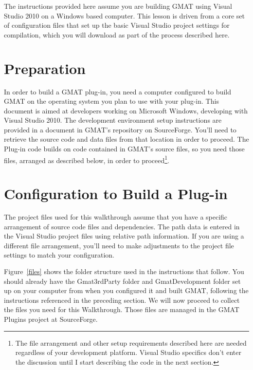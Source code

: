 \documentclass[10pt,letterpaper]{article}
\begin{document}
The instructions provided here assume you are building GMAT using Visual Studio 2010 on a Windows based computer.  This lesson is driven from a core set of configuration files that set up the basic Visual Studio project settings for compilation, which you will download as part of the process described here. 

\section{Preparation}

In order to build a GMAT plug-in, you need a computer configured to build GMAT on the operating system you plan to use with your plug-in.  This document is aimed at developers working on Microsoft Windows, developing with Visual Studio 2010.  The development environment setup instructions are provided in a document in GMAT's repository on SourceForge\cite{vsSetup}.  You'll need to retrieve the source code and data files from that location in order to proceed.  The Plug-in code builds on code contained in GMAT's source files, so you need those files, arranged as described below, in order to proceed\footnote{The file arrangement and other setup requirements described here are needed regardless of your development platform.  Visual Studio specifics don't enter the discussion until I start describing the code in the next section.}.

\section{Configuration to Build a Plug-in}

The project files used for this walkthrough assume that you have a specific arrangement of source code files and dependencies.  The path data is entered in the Visual Studio project files using relative path information.  If you are using a different file arrangement, you'll need to make adjustments to the project file settings to match your configuration.

Figure~\ref{files} shows the folder structure used in the instructions that follow.  You should already have the Gmat3rdParty folder and GmatDevelopment folder set up on your computer from when you configured it and built GMAT, following the instructions referenced in the preceding section.  We will now proceed to collect the files you need for this Walkthrough.  Those files are managed in the GMAT Plugins project at SourceForge.
\end{document}

